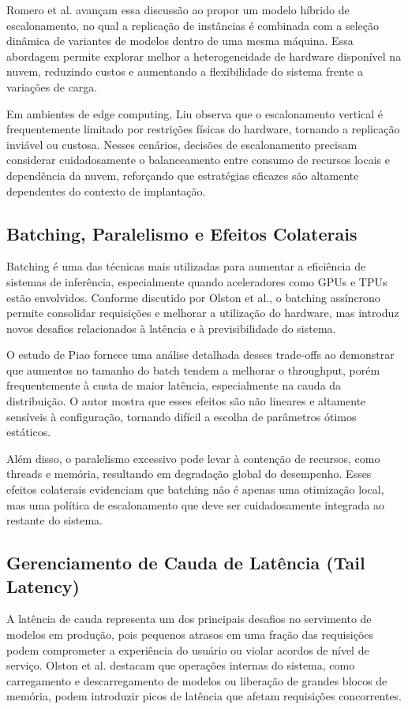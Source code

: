 Romero et al. avançam essa discussão ao propor um modelo híbrido de escalonamento, no qual a replicação de instâncias é combinada com a seleção dinâmica de variantes de modelos dentro de uma mesma máquina. Essa abordagem permite explorar melhor a heterogeneidade de hardware disponível na nuvem, reduzindo custos e aumentando a flexibilidade do sistema frente a variações de carga.

Em ambientes de edge computing, Liu observa que o escalonamento vertical é frequentemente limitado por restrições físicas do hardware, tornando a replicação inviável ou custosa. Nesses cenários, decisões de escalonamento precisam considerar cuidadosamente o balanceamento entre consumo de recursos locais e dependência da nuvem, reforçando que estratégias eficazes são altamente dependentes do contexto de implantação.
\subsection{Batching, Paralelismo e Efeitos Colaterais}
Batching é uma das técnicas mais utilizadas para aumentar a eficiência de sistemas de inferência, especialmente quando aceleradores como GPUs e TPUs estão envolvidos. Conforme discutido por Olston et al., o batching assíncrono permite consolidar requisições e melhorar a utilização do hardware, mas introduz novos desafios relacionados à latência e à previsibilidade do sistema.

O estudo de Piao fornece uma análise detalhada desses trade-offs ao demonstrar que aumentos no tamanho do batch tendem a melhorar o throughput, porém frequentemente à custa de maior latência, especialmente na cauda da distribuição. O autor mostra que esses efeitos são não lineares e altamente sensíveis à configuração, tornando difícil a escolha de parâmetros ótimos estáticos.

Além disso, o paralelismo excessivo pode levar à contenção de recursos, como threads e memória, resultando em degradação global do desempenho. Esses efeitos colaterais evidenciam que batching não é apenas uma otimização local, mas uma política de escalonamento que deve ser cuidadosamente integrada ao restante do sistema.
\subsection{Gerenciamento de Cauda de Latência (Tail Latency)}
A latência de cauda representa um dos principais desafios no servimento de modelos em produção, pois pequenos atrasos em uma fração das requisições podem comprometer a experiência do usuário ou violar acordos de nível de serviço. Olston et al. destacam que operações internas do sistema, como carregamento e descarregamento de modelos ou liberação de grandes blocos de memória, podem introduzir picos de latência que afetam requisições concorrentes.

